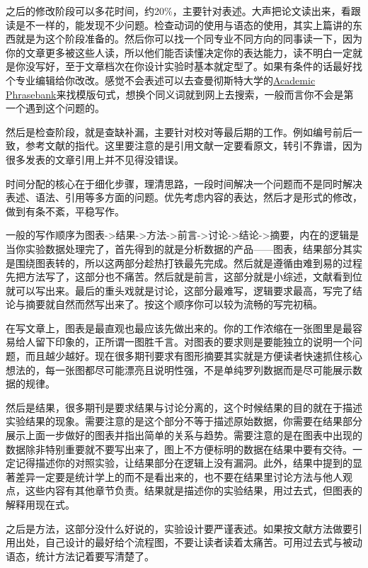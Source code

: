 \documentclass[]{tufte-book}
\begin{document}
之后的修改阶段可以多花时间，约20\%，主要针对表述。大声把论文读出来，看跟读是不一样的，能发现不少问题。检查动词的使用与语态的使用，其实上篇讲的东西就是为这个阶段准备的。然后你可以找一个同专业不同方向的同事读一下，因为你的文章更多被这些人读，所以他们能否读懂决定你的表达能力，读不明白一定就是你没写好，至于文章档次在你设计实验时基本就定型了。如果有条件的话最好找个专业编辑给你改改。感觉不会表述可以去查曼彻斯特大学的\href{https://www.phrasebank.manchester.ac.uk/}{Academic Phrasebank}来找模版句式，想换个同义词就到网上去搜索，一般而言你不会是第一个遇到这个问题的。

然后是检查阶段，就是查缺补漏，主要针对校对等最后期的工作。例如编号前后一致，参考文献的指代。这里要注意的是引用文献一定要看原文，转引不靠谱，因为很多发表的文章引用上并不见得没错误。

时间分配的核心在于细化步骤，理清思路，一段时间解决一个问题而不是同时解决表述、语法、引用等多方面的问题。优先考虑内容的表达，然后才是形式的修改，做到有条不紊，平稳写作。

一般的写作顺序为图表-\textgreater 结果-\textgreater 方法-\textgreater 前言-\textgreater 讨论-\textgreater 结论-\textgreater 摘要，内在的逻辑是当你实验数据处理完了，首先得到的就是分析数据的产品------图表，结果部分其实是围绕图表转的，所以这两部分趁热打铁最先完成。然后就是遵循由难到易的过程先把方法写了，这部分也不痛苦。然后就是前言，这部分就是小综述，文献看到位就可以写出来。最后的重头戏就是讨论，这部分最难写，逻辑要求最高，写完了结论与摘要就自然而然写出来了。按这个顺序你可以较为流畅的写完初稿。

在写文章上，图表是最直观也最应该先做出来的。你的工作浓缩在一张图里是最容易给人留下印象的，正所谓一图胜千言。对图表的要求则是要能独立的说明一个问题，而且越少越好。现在很多期刊要求有图形摘要其实就是方便读者快速抓住核心想法的，每一张图都尽可能漂亮且说明性强，不是单纯罗列数据而是尽可能展示数据的规律。

然后是结果，很多期刊是要求结果与讨论分离的，这个时候结果的目的就在于描述实验结果的现象。需要注意的是这个部分不等于描述原始数据，你需要在结果部分展示上面一步做好的图表并指出简单的关系与趋势。需要注意的是在图表中出现的数据除非特别重要就不要写出来了，图上不方便标明的数据在结果中要有交待。一定记得描述你的对照实验，让结果部分在逻辑上没有漏洞。此外，结果中提到的显著差异一定要是统计学上的而不是看出来的，也不要在结果里讨论方法与他人观点，这些内容有其他章节负责。结果就是描述你的实验结果，用过去式，但图表的解释用现在式。

之后是方法，这部分没什么好说的，实验设计要严谨表述。如果按文献方法做要引用出处，自己设计的最好给个流程图，不要让读者读着太痛苦。可用过去式与被动语态，统计方法记着要写清楚了。
\end{document}

